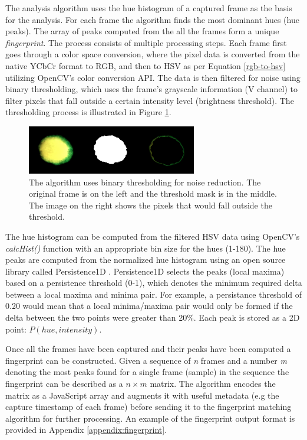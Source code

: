 \documentclass[thesis.tex]{subfiles}
\begin{document}
The analysis algorithm uses the hue histogram of a captured frame as the basis for the analysis. For each frame the algorithm finds the most dominant hues (hue peaks). The array of peaks computed from the all the frames form a unique \emph{fingerprint}. The process consists of multiple processing steps. Each frame first goes through a color space conversion, where the pixel data is converted from the native YCbCr format to RGB, and then to HSV as per Equation \ref{rgb-to-hsv} utilizing OpenCV's color conversion API. The data is then filtered for noise using binary thresholding, which uses the frame's grayscale information (V channel) to filter pixels that fall outside a certain intensity level (brightness threshold). The thresholding process is illustrated in Figure \ref{figure:binary-thresholding}.

\begin{figure}[h]
\centering \includegraphics[width=\textwidth,height=\textheight,keepaspectratio=true]{images/design_implementation/binary_thresholding}
\caption{The algorithm uses binary thresholding for noise reduction. The original frame is on the left and the threshold mask is in the middle. The image on the right shows the pixels that would fall outside the threshold.\label{figure:binary-thresholding}}
\end{figure}

The hue histogram can be computed from the filtered HSV data using OpenCV's \emph{calcHist()} function with an appropriate bin size for the hues (1-180). The hue peaks are computed from the normalized hue histogram using an open source library called Persistence1D \cite{persistence1d}. Persistence1D selects the peaks (local maxima) based on a persistence threshold (0-1), which denotes the minimum required delta between a local maxima and minima pair. For example, a persistance threshold of 0.20 would mean that a local minima/maxima pair would only be formed if the delta between the two points were greater than 20\%. Each peak is stored as a 2D point: $P(hue, intensity)$.

Once all the frames have been captured and their peaks have been computed a fingerprint can be constructed. Given a sequence of \emph{n} frames and a number \emph{m} denoting the most peaks found for a single frame (sample) in the sequence the fingerprint can be described as a $n \times m$ matrix. The algorithm encodes the matrix as a JavaScript array and augments it with useful metadata (e.g the capture timestamp of each frame) before sending it to the fingerprint matching algorithm for further processing. An example of the fingerprint output format is provided in Appendix \ref{appendix:fingerprint}.
\end{document}
